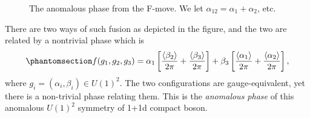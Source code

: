 \documentclass[11pt,toc=bibliography]{scrbook}
\numberwithin{equation}{section}
\begin{document}
\begin{figure}[t]


\caption{\label{fig-F-move}The anomalous phase from the F-move. We let
\(\alpha_{12} = \alpha_1+\alpha_2\), etc.}

\end{figure}%

There are two ways of such fusion as depicted in the figure, and the two
are related by a nontrivial phase which is
\begin{equation}\phantomsection\label{eq-cocycle-boson}{
f(g_1,g_2,g_3) = \alpha_1\left[\frac{\langle\beta_2\rangle}{2\pi}+\frac{\langle\beta_3\rangle}{2\pi}\right]+\beta_3\left[\frac{\langle\alpha_1\rangle}{2\pi}+\frac{\langle\alpha_2\rangle}{2\pi}\right],
}\end{equation} where \(g_i = (\alpha_i,\beta_i)\in U(1)^2\). The two
configurations are gauge-equivalent, yet there is a non-trivial phase
relating them. This is the \emph{anomalous phase} of this anomalous
\(U(1)^2\) symmetry of 1+1d compact boson.
\end{document}
